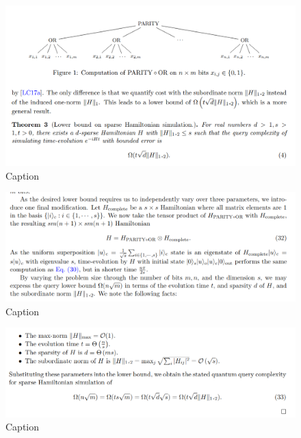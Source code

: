 \documentclass[
10pt, %
a4paper, %
oneside, %
headinclude,footinclude, %
BCOR5mm, %
]{scrartcl}
\begin{document}
\begin{figure}[H]
    \centering
    \includegraphics[width=\linewidth]{1.png}
    \caption{Caption}
    \label{fig:my_label}
\end{figure}

\begin{figure}[H]
    \centering
    \includegraphics[width=\linewidth]{2.png}
    \caption{Caption}
    \label{fig:my_label}
\end{figure}

\begin{figure}[H]
    \centering
    \includegraphics[width=\linewidth]{3.png}
    \caption{Caption}
    \label{fig:my_label}
\end{figure}
\end{document}
